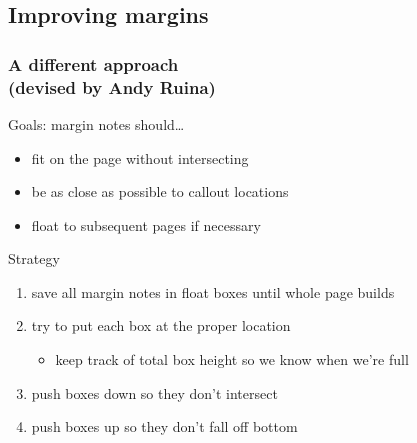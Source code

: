 \documentclass{beamer}
\begin{document}
\subsection{Improving margins}
\begin{frame}
  \frametitle{A different approach\\\normalsize(devised by Andy Ruina)}
  \begin{block}{Goals: margin notes should\ldots}
    \begin{itemize}
    \item fit on the page without intersecting
    \item be as close as possible to callout locations
    \item float to subsequent pages if necessary
    \end{itemize}
  \end{block}
  \begin{block}{Strategy}
    \begin{enumerate}
      \addtocounter{enumi}{-1}
    \item save all margin notes in float boxes until whole page builds
    \item try to put each box at the proper location
      \begin{itemize}
      \item keep track of total box height so we know when we're full
      \end{itemize}
    \item push boxes down so they don't intersect
    \item push boxes up so they don't fall off bottom
    \end{enumerate}
  \end{block}
\end{frame}
\end{document}
